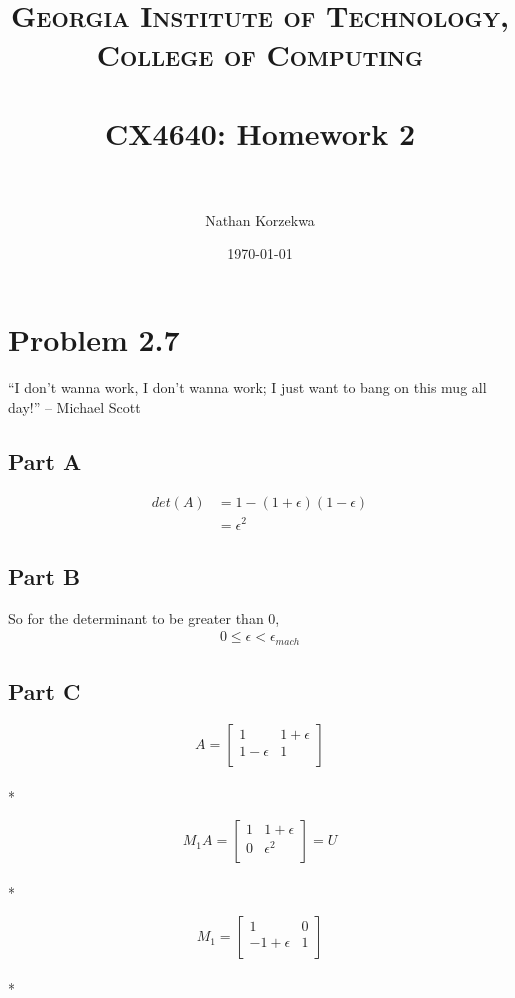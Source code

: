 \documentclass[paper=a4, fontsize=11pt]{scrartcl} %
\title {	
\normalfont \normalsize 
\textsc{Georgia Institute of Technology, College of Computing} \\ [25pt] %
\horrule{0.5pt} \\[0.4cm] %
\huge CX4640: Homework 2 \\ %
\horrule{2pt} \\[0.5cm] %
}
\author{Nathan Korzekwa} %
\date{\normalsize\today} %
\numberwithin{equation}{section} %
\numberwithin{figure}{section} %
\numberwithin{table}{section} %
\begin{document}
\maketitle %


\section*{Problem 2.7}
``I don't wanna work, I don't wanna work; I just want to bang on this mug all day!'' -- Michael Scott \\


\subsection*{Part A}
\begin{align}
det(A) &= 1 - (1 + \epsilon)(1 - \epsilon) \\
	   &= \epsilon^2	
\end{align}

\subsection*{Part B}
So for the determinant to be greater than 0, 
\begin{align}
	0 \leq \epsilon < \epsilon_{mach}
\end{align}

\subsection*{Part C}
$$A =
\left[\begin{array}{cc}
1 & 1 + \epsilon\\
1 - \epsilon & 1\\
\end{array}\right]$$ \\*

$$M_1A =
\left[\begin{array}{cc}
1 & 1 + \epsilon\\
0 & \epsilon^2\\
\end{array}\right] = U$$ \\*

$$M_1 =
\left[\begin{array}{cc}
1 & 0\\
-1 + \epsilon & 1\\
\end{array}\right]$$ \\*
\end{document}
